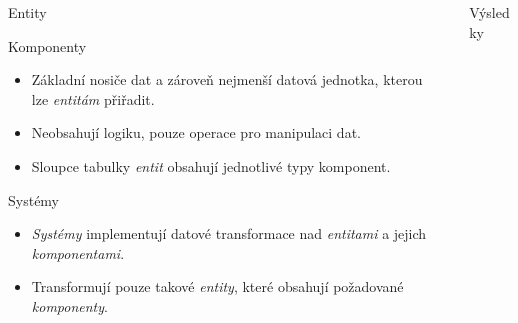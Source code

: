 \documentclass[final,hyperref={pdfpagelabels=false}]{beamer}
\begin{document}
\begin{frame}[t, fragile]
\begin{columns}[t]
\begin{column}{.465\textwidth}
\begin{block}{Entity}
\end{block}


\begin{block}{Komponenty}
	
	\begin{itemize}
		\item Základní nosiče dat a zároveň nejmenší datová jednotka, kterou lze \emph{entitám} přiřadit.
		\item Neobsahují  logiku, pouze operace pro manipulaci dat.
		\item Sloupce tabulky \emph{entit} obsahují jednotlivé typy komponent.
	\end{itemize}
	
\end{block}


\begin{block}{Systémy}
	
	\begin{itemize}
		\item \emph{Systémy} implementují datové transformace nad \emph{entitami} a jejich \emph{komponentami}.
		\item Transformují pouze takové \emph{entity}, které obsahují požadované \emph{komponenty}.
	\end{itemize}
	
\end{block}


\end{column} %

\begin{column}{.03\textwidth}\end{column} %
 
\begin{column}{.465\textwidth} %
	

\begin{block}{Výsledky}


\end{block}
\end{column}
\end{columns}
\end{frame}
\end{document}
